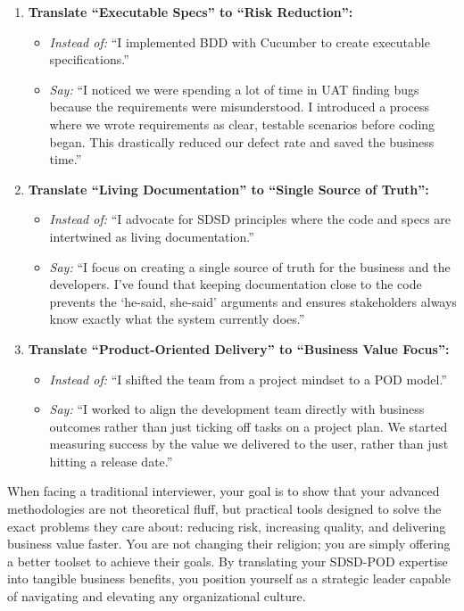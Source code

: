 \documentclass[
  11pt,
  openany,
  oneside]{book}
\providecommand{\tightlist}{%
  \setlength{\itemsep}{0pt}\setlength{\parskip}{0pt}}
\begin{document}
\begin{enumerate}
\def\labelenumi{\arabic{enumi}.}
\tightlist
\item
  \textbf{Translate ``Executable Specs'' to ``Risk Reduction'':}

  \begin{itemize}
  \tightlist
  \item
    \emph{Instead of:} ``I implemented BDD with Cucumber to create
    executable specifications.''
  \item
    \emph{Say:} ``I noticed we were spending a lot of time in UAT
    finding bugs because the requirements were misunderstood. I
    introduced a process where we wrote requirements as clear, testable
    scenarios before coding began. This drastically reduced our defect
    rate and saved the business time.''
  \end{itemize}
\item
  \textbf{Translate ``Living Documentation'' to ``Single Source of
  Truth'':}

  \begin{itemize}
  \tightlist
  \item
    \emph{Instead of:} ``I advocate for SDSD principles where the code
    and specs are intertwined as living documentation.''
  \item
    \emph{Say:} ``I focus on creating a single source of truth for the
    business and the developers. I've found that keeping documentation
    close to the code prevents the `he-said, she-said' arguments and
    ensures stakeholders always know exactly what the system currently
    does.''
  \end{itemize}
\item
  \textbf{Translate ``Product-Oriented Delivery'' to ``Business Value
  Focus'':}

  \begin{itemize}
  \tightlist
  \item
    \emph{Instead of:} ``I shifted the team from a project mindset to a
    POD model.''
  \item
    \emph{Say:} ``I worked to align the development team directly with
    business outcomes rather than just ticking off tasks on a project
    plan. We started measuring success by the value we delivered to the
    user, rather than just hitting a release date.''
  \end{itemize}
\end{enumerate}

When facing a traditional interviewer, your goal is to show that your
advanced methodologies are not theoretical fluff, but practical tools
designed to solve the exact problems they care about: reducing risk,
increasing quality, and delivering business value faster. You are not
changing their religion; you are simply offering a better toolset to
achieve their goals. By translating your SDSD-POD expertise into
tangible business benefits, you position yourself as a strategic leader
capable of navigating and elevating any organizational culture.
\end{document}
